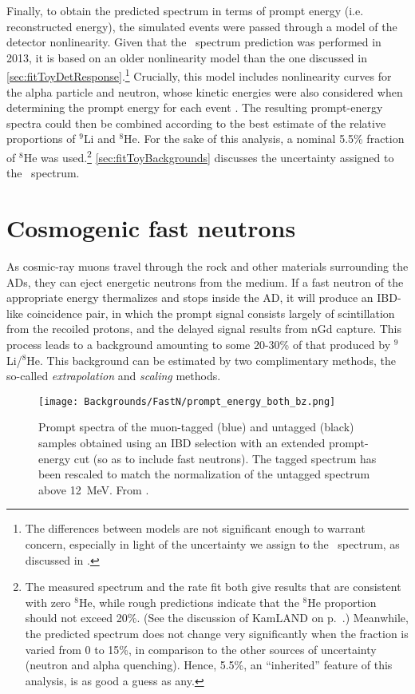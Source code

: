 \documentclass[../thesis.tex]{subfiles}
\begin{document}
Finally, to obtain the predicted spectrum in terms of prompt energy (i.e. reconstructed energy), the simulated events were passed through a model of the detector nonlinearity. Given that the \LiHe\ spectrum prediction was performed in 2013, it is based on an older nonlinearity model than the one discussed in \autoref{sec:fitToyDetResponse}.\footnote{The differences between models are not significant enough to warrant concern, especially in light of the uncertainty we assign to the \LiHe\ spectrum, as discussed in \cite{berkeley_toymc}.} Crucially, this model includes nonlinearity curves for the alpha particle and neutron, whose kinetic energies were also considered when determining the prompt energy for each event \cite{bcwNonlin}. The resulting prompt-energy spectra could then be combined according to the best estimate of the relative proportions of $^9$Li and $^8$He. For the sake of this analysis, a nominal 5.5\% fraction of $^8$He was used.\footnote{The measured spectrum and the rate fit both give results that are consistent with zero $^8$He, while rough predictions indicate that the $^8$He proportion should not exceed 20\%. (See the discussion of KamLAND on p.~\pageref{par:kamland_he8}.) Meanwhile, the predicted spectrum does not change very significantly when the fraction is varied from 0 to 15\%, in comparison to the other sources of uncertainty (neutron and alpha quenching). Hence, 5.5\%, an ``inherited'' feature of this analysis, is as good a guess as any.} \autoref{sec:fitToyBackgrounds} discusses the uncertainty assigned to the \LiHe\ spectrum.

\section{Cosmogenic fast neutrons}
\label{sec:bkgFastnOverview}

As cosmic-ray muons travel through the rock and other materials surrounding the ADs, they can eject energetic neutrons from the medium. If a fast neutron of the appropriate energy thermalizes and stops inside the AD, it will produce an IBD-like coincidence pair, in which the prompt signal consists largely of scintillation from the recoiled protons, and the delayed signal results from nGd capture. This process leads to a background amounting to some 20-30\% of that produced by $^9$Li/$^8$He. This background can be estimated by two complimentary methods, the so-called \emph{extrapolation} and \emph{scaling} methods.

\begin{figure}[h!]
  \texttt{[image: Backgrounds/FastN/prompt\_energy\_both\_bz.png]}
  \caption{Prompt spectra of the muon-tagged (blue) and untagged (black) samples obtained using an IBD selection with an extended prompt-energy cut (so as to include fast neutrons). The tagged spectrum has been rescaled to match the normalization of the untagged spectrum above 12~MeV. From \cite{fastn}.}
  \label{fig:fastn_prompt_energy_both_bzOverview}
\end{figure}
\end{document}
